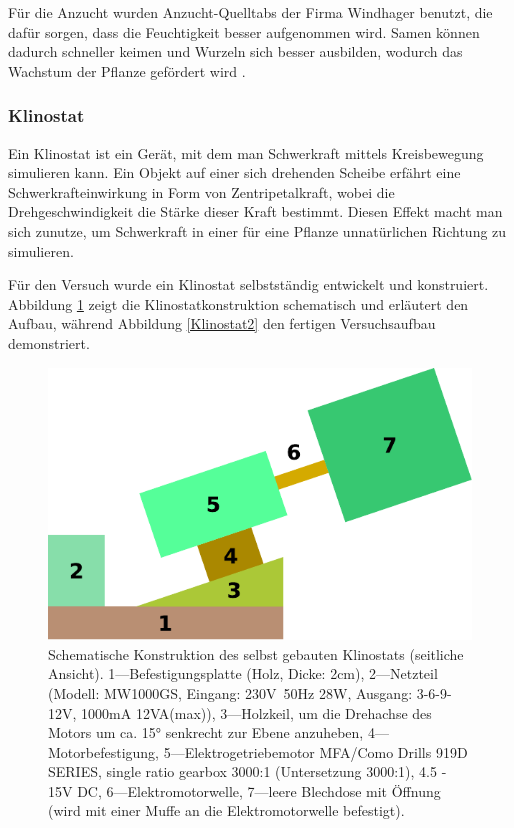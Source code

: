 \documentclass[
11pt, 
ngerman,
listof=totocnumbered,
oneside,
bibliography=totocnumbered,
abstracton
]{scrreprt}
\begin{document}
Für die Anzucht wurden Anzucht-Quelltabs der Firma Windhager benutzt, die dafür sorgen, dass die Feuchtigkeit besser aufgenommen wird. Samen können dadurch schneller keimen und Wurzeln sich besser ausbilden, wodurch das Wachstum der Pflanze gefördert wird \parencite{Windhager}. 

\subsubsection{Klinostat}

Ein Klinostat ist ein Gerät, mit dem man Schwerkraft mittels Kreisbewegung simulieren kann. Ein Objekt auf einer sich drehenden Scheibe erfährt eine Schwerkrafteinwirkung in Form von Zentripetalkraft, wobei die Drehgeschwindigkeit die Stärke dieser Kraft bestimmt. Diesen Effekt macht man sich zunutze, um Schwerkraft in einer für eine Pflanze unnatürlichen Richtung zu simulieren. 

Für den Versuch wurde ein Klinostat selbstständig entwickelt und konstruiert. Abbildung \ref{Klinstat1} zeigt die Klinostatkonstruktion schematisch und erläutert den Aufbau, während Abbildung \ref{Klinostat2} den fertigen Versuchsaufbau demonstriert. 

\begin{figure}[H]
	\centering 
	\includegraphics[width = 0.75\linewidth]{images/drawing-1.pdf}
	\caption{Schematische Konstruktion des selbst gebauten Klinostats (seitliche Ansicht). 1---Befestigungsplatte (Holz, Dicke: 2cm), 2---Netzteil (Modell: MW1000GS, Eingang: 230V~50Hz 28W, Ausgang: 3-6-9-12V, 1000mA 12VA(max)), 3---Holzkeil, um die Drehachse des Motors um ca. \ang{15} senkrecht zur Ebene anzuheben, 4---Motorbefestigung, 5---Elektrogetriebemotor MFA/Como Drills 919D SERIES, single ratio gearbox 3000:1 (Untersetzung 3000:1), 4.5 - 15V DC, 6---Elektromotorwelle, 7---leere Blechdose mit Öffnung (wird mit einer Muffe an die Elektromotorwelle befestigt)\label{Klinstat1}.}
\end{figure} 
\end{document}
